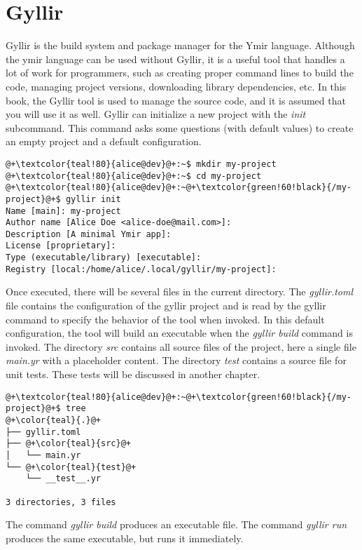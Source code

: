 \section{Gyllir}

Gyllir is the build system and package manager for the Ymir language. Although
the ymir language can be used without Gyllir, it is a useful tool that handles a
lot of work for programmers, such as creating proper command lines to build the
code, managing project versions, downloading library dependencies, etc. In this
book, the Gyllir tool is used to manage the source code, and it is assumed that
you will use it as well. Gyllir can initialize a new project with the
\textit{init} subcommand. This command asks some questions (with default values)
to create an empty project and a default configuration.

\begin{lstlisting}[style=bashVerb, escapechar=@+]
@+\textcolor{teal!80}{alice@dev}@+:~$ mkdir my-project
@+\textcolor{teal!80}{alice@dev}@+:~$ cd my-project
@+\textcolor{teal!80}{alice@dev}@+:~@+\textcolor{green!60!black}{/my-project}@+$ gyllir init
Name [main]: my-project
Author name [Alice Doe <alice-doe@mail.com>]:
Description [A minimal Ymir app]:
License [proprietary]:
Type (executable/library) [executable]:
Registry [local:/home/alice/.local/gyllir/my-project]:
\end{lstlisting}

Once executed, there will be several files in the current directory.
The \textit{gyllir.toml} file contains the configuration of the gyllir project
and is read by the gyllir command to specify the behavior of the tool when
invoked. In this default configuration, the tool will build an executable when
the \textit{gyllir build} command is invoked. The directory \textit{src}
contains all source files of the project, here a single file \textit{main.yr}
with a placeholder content. The directory \textit{test} contains a source file
for unit tests. These tests will be discussed in another chapter.

\begin{lstlisting}[style=bashVerb, escapechar=@+]
@+\textcolor{teal!80}{alice@dev}@+:~@+\textcolor{green!60!black}{/my-project}@+$ tree
@+\color{teal}{.}@+
├── gyllir.toml
├── @+\color{teal}{src}@+
│   └── main.yr
└── @+\color{teal}{test}@+
    └── __test__.yr

3 directories, 3 files
\end{lstlisting}

The command \textit{gyllir build} produces an executable file. The
command \textit{gyllir run} produces the same executable, but runs it
immediately.

